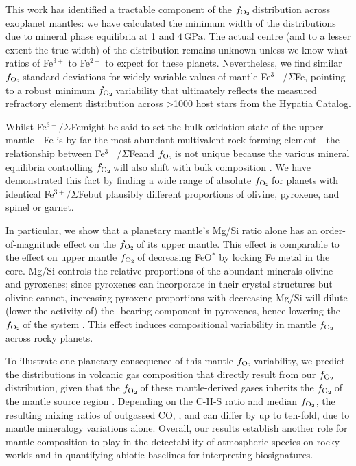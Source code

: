 \documentclass[fleqn,usenatbib,twocolumn]{mnras}
\newcommand{\fo}{$f_{\ce{O2}}$}
\newcommand{\ferric}{\ce{Fe^{3+}}}
\newcommand{\xfer}{Fe$^{3+}/\Sigma$Fe}
\begin{document}
This work has identified a tractable component of the \fo\,distribution across exoplanet mantles: we have calculated the minimum width of the distributions due to mineral phase equilibria at 1 and $4\,\text{GPa}$. The actual centre (and to a lesser extent the true width) of the distribution remains unknown unless we know what ratios of Fe$^{3+}$ to Fe$^{2+}$ to expect for these planets. Nevertheless, we find similar \fo\,standard deviations for widely variable values of mantle \xfer, pointing to a robust minimum \fo\,variability that ultimately reflects the measured refractory element distribution across \textgreater 1000 host stars from the Hypatia Catalog. 

Whilst \xfer\;might be said to set the bulk oxidation state of the upper mantle---Fe is by far the most abundant multivalent rock-forming element---the relationship between \xfer\;and \fo\,is not unique because the various mineral equilibria controlling \fo\,will also shift with bulk composition \citep{frost_introduction_1991}. We have demonstrated this fact by finding a wide range of absolute \fo\,for planets with identical \xfer\;but plausibly different proportions of olivine, pyroxene, and spinel or garnet.

In particular, we show that a planetary mantle’s Mg/Si ratio alone has an order-of-magnitude effect on the \fo\,of its upper mantle. This effect is comparable to the effect on upper mantle \fo\,of decreasing FeO$^*$ by locking Fe metal in the core. Mg/Si controls the relative proportions of the abundant minerals olivine and pyroxenes; since pyroxenes can incorporate \ferric\;in their crystal structures but olivine cannot, increasing pyroxene proportions with decreasing Mg/Si will dilute (lower the activity of) the \ferric-bearing component in pyroxenes, hence lowering the \fo\,of the system \citep{stolper_effects_2020}. This effect induces compositional variability in mantle \fo\,across rocky planets.

To illustrate one planetary consequence of this mantle \fo\,variability, we predict the distributions in volcanic gas composition that directly result from our \fo\,distribution, given that the \fo\,of these mantle-derived gases inherits the \fo\,of the mantle source region \citep[e.g.,][]{gaillard_redox_2015}. Depending on the C-H-S ratio and median \fo, the resulting mixing ratios of outgassed CO, , and  can differ by up to ten-fold, due to mantle mineralogy variations alone. Overall, our results establish another role for mantle composition to play in the detectability of atmospheric species on rocky worlds and in quantifying abiotic baselines for interpreting biosignatures.
\end{document}

